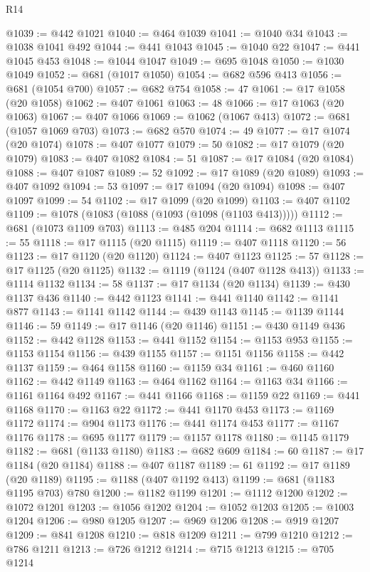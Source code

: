 \begin{lexlean}{R14}
\begin{coremodule}
@1039 := @442 @1021
@1040 := @464 @1039
@1041 := @1040 @34
@1043 := @1038 @1041 @492
@1044 := @441 @1043
@1045 := @1040 @22
@1047 := @441 @1045 @453
@1048 := @1044 @1047
@1049 := @695 @1048
@1050 := @1030 @1049
@1052 := @681 (@1017 @1050)
@1054 := @682 @596 @413
@1056 := @681 (@1054 @700)
@1057 := @682 @754
@1058 := 47
@1061 := @17 @1058 (@20 @1058)
@1062 := @407 @1061
@1063 := 48
@1066 := @17 @1063 (@20 @1063)
@1067 := @407 @1066
@1069 := @1062 (@1067 @413)
@1072 := @681 (@1057 @1069 @703)
@1073 := @682 @570
@1074 := 49
@1077 := @17 @1074 (@20 @1074)
@1078 := @407 @1077
@1079 := 50
@1082 := @17 @1079 (@20 @1079)
@1083 := @407 @1082
@1084 := 51
@1087 := @17 @1084 (@20 @1084)
@1088 := @407 @1087
@1089 := 52
@1092 := @17 @1089 (@20 @1089)
@1093 := @407 @1092
@1094 := 53
@1097 := @17 @1094 (@20 @1094)
@1098 := @407 @1097
@1099 := 54
@1102 := @17 @1099 (@20 @1099)
@1103 := @407 @1102
@1109 := @1078 (@1083 (@1088 (@1093 (@1098 (@1103 @413)))))
@1112 := @681 (@1073 @1109 @703)
@1113 := @485 @204
@1114 := @682 @1113
@1115 := 55
@1118 := @17 @1115 (@20 @1115)
@1119 := @407 @1118
@1120 := 56
@1123 := @17 @1120 (@20 @1120)
@1124 := @407 @1123
@1125 := 57
@1128 := @17 @1125 (@20 @1125)
@1132 := @1119 (@1124 (@407 @1128 @413))
@1133 := @1114 @1132
@1134 := 58
@1137 := @17 @1134 (@20 @1134)
@1139 := @430 @1137 @436
@1140 := @442 @1123
@1141 := @441 @1140
@1142 := @1141 @877
@1143 := @1141 @1142
@1144 := @439 @1143
@1145 := @1139 @1144
@1146 := 59
@1149 := @17 @1146 (@20 @1146)
@1151 := @430 @1149 @436
@1152 := @442 @1128
@1153 := @441 @1152
@1154 := @1153 @953
@1155 := @1153 @1154
@1156 := @439 @1155
@1157 := @1151 @1156
@1158 := @442 @1137
@1159 := @464 @1158
@1160 := @1159 @34
@1161 := @460 @1160
@1162 := @442 @1149
@1163 := @464 @1162
@1164 := @1163 @34
@1166 := @1161 @1164 @492
@1167 := @441 @1166
@1168 := @1159 @22
@1169 := @441 @1168
@1170 := @1163 @22
@1172 := @441 @1170 @453
@1173 := @1169 @1172
@1174 := @904 @1173
@1176 := @441 @1174 @453
@1177 := @1167 @1176
@1178 := @695 @1177
@1179 := @1157 @1178
@1180 := @1145 @1179
@1182 := @681 (@1133 @1180)
@1183 := @682 @609
@1184 := 60
@1187 := @17 @1184 (@20 @1184)
@1188 := @407 @1187
@1189 := 61
@1192 := @17 @1189 (@20 @1189)
@1195 := @1188 (@407 @1192 @413)
@1199 := @681 (@1183 @1195 @703) @780
@1200 := @1182 @1199
@1201 := @1112 @1200
@1202 := @1072 @1201
@1203 := @1056 @1202
@1204 := @1052 @1203
@1205 := @1003 @1204
@1206 := @980 @1205
@1207 := @969 @1206
@1208 := @919 @1207
@1209 := @841 @1208
@1210 := @818 @1209
@1211 := @799 @1210
@1212 := @786 @1211
@1213 := @726 @1212
@1214 := @715 @1213
@1215 := @705 @1214

\end{coremodule}
\end{lexlean}
